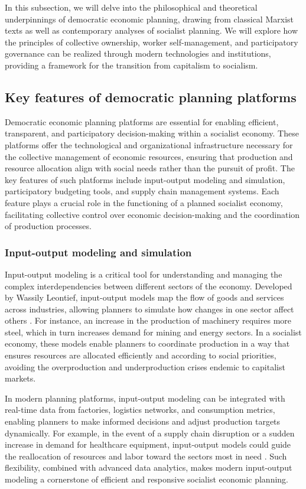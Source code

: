 \begin{refsection}
In this subsection, we will delve into the philosophical and theoretical underpinnings of democratic economic planning, drawing from classical Marxist texts as well as contemporary analyses of socialist planning. We will explore how the principles of collective ownership, worker self-management, and participatory governance can be realized through modern technologies and institutions, providing a framework for the transition from capitalism to socialism.

\subsection{Key features of democratic planning platforms}

Democratic economic planning platforms are essential for enabling efficient, transparent, and participatory decision-making within a socialist economy. These platforms offer the technological and organizational infrastructure necessary for the collective management of economic resources, ensuring that production and resource allocation align with social needs rather than the pursuit of profit. The key features of such platforms include input-output modeling and simulation, participatory budgeting tools, and supply chain management systems. Each feature plays a crucial role in the functioning of a planned socialist economy, facilitating collective control over economic decision-making and the coordination of production processes.

\subsubsection{Input-output modeling and simulation}

Input-output modeling is a critical tool for understanding and managing the complex interdependencies between different sectors of the economy. Developed by Wassily Leontief, input-output models map the flow of goods and services across industries, allowing planners to simulate how changes in one sector affect others \cite[pp.~12]{leontief2009economics}. For instance, an increase in the production of machinery requires more steel, which in turn increases demand for mining and energy sectors. In a socialist economy, these models enable planners to coordinate production in a way that ensures resources are allocated efficiently and according to social priorities, avoiding the overproduction and underproduction crises endemic to capitalist markets.

In modern planning platforms, input-output modeling can be integrated with real-time data from factories, logistics networks, and consumption metrics, enabling planners to make informed decisions and adjust production targets dynamically. For example, in the event of a supply chain disruption or a sudden increase in demand for healthcare equipment, input-output models could guide the reallocation of resources and labor toward the sectors most in need \cite[pp.~87]{cockshott1993towards}. Such flexibility, combined with advanced data analytics, makes modern input-output modeling a cornerstone of efficient and responsive socialist economic planning.


\end{refsection}
